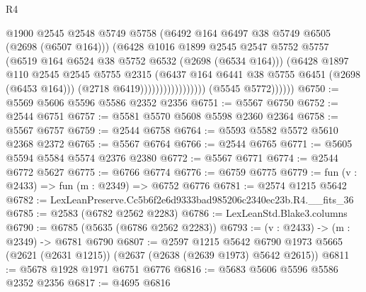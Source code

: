 \begin{lexlean}{R4}
\begin{coremodule}
                                          @1900
                                          @2545
                                          @2548
                                          @5749
                                          @5758
                                          (@6492 @164 @6497 @38 @5749 @6505 (@2698 (@6507 @164)))
                                          (@6428
                                            @1016
                                            @1899
                                            @2545
                                            @2547
                                            @5752
                                            @5757
                                            (@6519 @164 @6524 @38 @5752 @6532 (@2698 (@6534 @164)))
                                            (@6428
                                              @1897
                                              @110
                                              @2545
                                              @2545
                                              @5755
                                              @2315
                                              (@6437
                                                @164
                                                @6441
                                                @38
                                                @5755
                                                @6451
                                                (@2698 (@6453 @164)))
                                              (@2718 @6419)))))))))))))))))
              (@5545 @5772))))))
@6750 := @5569 @5606 @5596 @5586 @2352 @2356
@6751 := @5567 @6750
@6752 := @2544 @6751
@6757 := @5581 @5570 @5608 @5598 @2360 @2364
@6758 := @5567 @6757
@6759 := @2544 @6758
@6764 := @5593 @5582 @5572 @5610 @2368 @2372
@6765 := @5567 @6764
@6766 := @2544 @6765
@6771 := @5605 @5594 @5584 @5574 @2376 @2380
@6772 := @5567 @6771
@6774 := @2544 @6772 @5627
@6775 := @6766 @6774
@6776 := @6759 @6775
@6779 := fun (v : @2433) => fun (m : @2349) => @6752 @6776
@6781 := @2574 @1215 @5642
@6782 := LexLeanPreserve.Cc5b6f2e6d9333bad985206c2340ec23b.R4.__fits_36
@6785 := @2583 (@6782 @2562 @2283)
@6786 := LexLeanStd.Blake3.columns
@6790 := @6785 (@5635 (@6786 @2562 @2283))
@6793 := (v : @2433) -> (m : @2349) -> @6781 @6790
@6807 := @2597
    @1215
    @5642
    @6790
    @1973
    @5665
    (@2621 (@2631 @1215))
    (@2637 (@2638 (@2639 @1973) @5642 @2615))
@6811 := @5678 @1928 @1971 @6751 @6776
@6816 := @5683 @5606 @5596 @5586 @2352 @2356
@6817 := @4695 @6816

\end{coremodule}
\end{lexlean}
